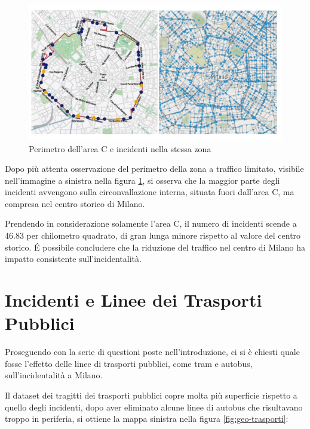 \documentclass[a4paper,12pt]{report}
\begin{document}
\begin{figure}
    \includegraphics[width=\linewidth]{../src/area_c/area_c_incidenti.png}
    \caption{Perimetro dell'area C e incidenti nella stessa zona}
    \label{fig:perimetro-area-c}
\end{figure}

Dopo più attenta osservazione del perimetro della zona a traffico limitato, 
visibile nell'immagine a sinistra nella 
figura \ref{fig:perimetro-area-c}, si osserva che la maggior parte degli 
incidenti avvengono sulla circonvallazione interna, 
situata fuori dall'area C, ma compresa nel centro storico di Milano.

Prendendo in considerazione solamente l'area C, il numero di incidenti scende a $46.83$ 
per chilometro quadrato, di gran lunga minore rispetto al valore del centro storico. 
\'E possibile concludere che la riduzione del traffico nel centro di Milano ha impatto 
consistente sull'incidentalità.

\section{Incidenti e Linee dei Trasporti Pubblici}

Proseguendo con la serie di questioni poste nell'introduzione, ci si è chiesti quale 
fosse l'effetto delle linee di trasporti pubblici, come tram e autobus, 
sull'incidentalità a Milano. 

Il dataset dei tragitti dei trasporti pubblici copre molta più superficie rispetto a 
quello degli incidenti, dopo aver eliminato alcune linee di autobus che risultavano 
troppo in periferia, si ottiene la mappa sinistra nella figura \ref{fig:geo-trasporti}: 
\end{document}
